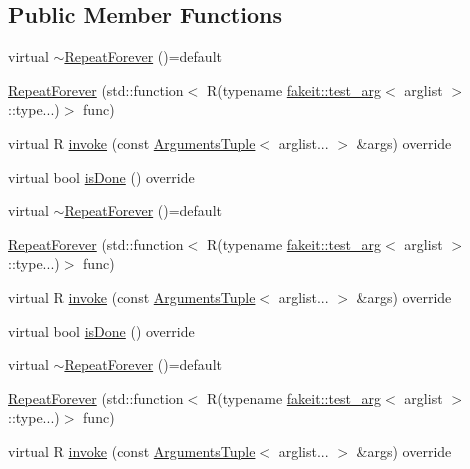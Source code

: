\subsection*{Public Member Functions}
\begin{DoxyCompactItemize}
\item 
virtual \mbox{\hyperlink{structfakeit_1_1RepeatForever_ae4c256607ab407cea8403d49538cb320}{$\sim$\+Repeat\+Forever}} ()=default
\item 
\mbox{\hyperlink{structfakeit_1_1RepeatForever_a4f3eb9d8eda23dcc882ab5363466a379}{Repeat\+Forever}} (std\+::function$<$ R(typename \mbox{\hyperlink{structfakeit_1_1test__arg}{fakeit\+::test\+\_\+arg}}$<$ arglist $>$\+::type...)$>$ func)
\item 
virtual R \mbox{\hyperlink{structfakeit_1_1RepeatForever_a9fcab18dc26a1f74a22e82a775f06ea6}{invoke}} (const \mbox{\hyperlink{namespacefakeit_a476a37a598825e1b5dd67b3a176491a1}{Arguments\+Tuple}}$<$ arglist... $>$ \&args) override
\item 
virtual bool \mbox{\hyperlink{structfakeit_1_1RepeatForever_af5922669a521e99ca18218972b86cb87}{is\+Done}} () override
\item 
virtual \mbox{\hyperlink{structfakeit_1_1RepeatForever_ae4c256607ab407cea8403d49538cb320}{$\sim$\+Repeat\+Forever}} ()=default
\item 
\mbox{\hyperlink{structfakeit_1_1RepeatForever_a4f3eb9d8eda23dcc882ab5363466a379}{Repeat\+Forever}} (std\+::function$<$ R(typename \mbox{\hyperlink{structfakeit_1_1test__arg}{fakeit\+::test\+\_\+arg}}$<$ arglist $>$\+::type...)$>$ func)
\item 
virtual R \mbox{\hyperlink{structfakeit_1_1RepeatForever_a9fcab18dc26a1f74a22e82a775f06ea6}{invoke}} (const \mbox{\hyperlink{namespacefakeit_a476a37a598825e1b5dd67b3a176491a1}{Arguments\+Tuple}}$<$ arglist... $>$ \&args) override
\item 
virtual bool \mbox{\hyperlink{structfakeit_1_1RepeatForever_af5922669a521e99ca18218972b86cb87}{is\+Done}} () override
\item 
virtual \mbox{\hyperlink{structfakeit_1_1RepeatForever_ae4c256607ab407cea8403d49538cb320}{$\sim$\+Repeat\+Forever}} ()=default
\item 
\mbox{\hyperlink{structfakeit_1_1RepeatForever_a4f3eb9d8eda23dcc882ab5363466a379}{Repeat\+Forever}} (std\+::function$<$ R(typename \mbox{\hyperlink{structfakeit_1_1test__arg}{fakeit\+::test\+\_\+arg}}$<$ arglist $>$\+::type...)$>$ func)
\item 
virtual R \mbox{\hyperlink{structfakeit_1_1RepeatForever_a9fcab18dc26a1f74a22e82a775f06ea6}{invoke}} (const \mbox{\hyperlink{namespacefakeit_a476a37a598825e1b5dd67b3a176491a1}{Arguments\+Tuple}}$<$ arglist... $>$ \&args) override

\end{DoxyCompactItemize}
